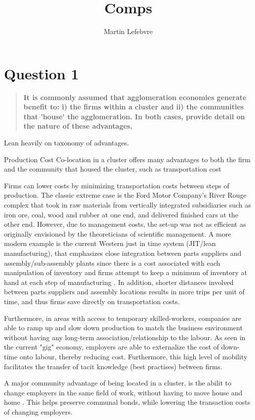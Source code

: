 \documentclass[12pt,letterpaper,notitlepage,onecolumn,final,openbib]{article}
\author{Martin Lefebvre}
\title{Comps}
\begin{document}
	
\section{Question 1}
\begin{quotation}
\textbf{It is commonly assumed that agglomeration economies generate benefit to: i) the firms within a cluster and ii) the communities that 'house' the agglomeration. In both cases, provide detail on the nature of these advantages.}

\end{quotation}


Lean heavily on  taxonomy of advantages.   

Production Cost
Co-location in a cluster offers many advantages to both the firm and the community that housed the cluster, such as transportation cost 

Firms can lower costs by minimizing transportation costs between steps of production.  The classic extreme case is the Ford Motor Company's River Rouge complex that took in raw materials from vertically integrated subsidiaries such as iron ore, coal, wood and rubber at one end, and delivered finished cars at the other end.  However, due to management costs, the set-up was not as efficient as originally envisioned by the theoreticians of scientific management. A more modern example is the current Western just in time system (JIT/lean manufacturing), that emphasizes close integration between parts suppliers and assembly/sub-assembly plants since there is a cost associated with each manipulation of inventory and firms attempt to keep a minimum of inventory at hand at each step of manufacturing \cite{Hallihan_JIT_1997}.  In addition, shorter distances involved between parts suppliers and assembly locations results in more trips per unit of time, and thus firms save directly on transportation costs. \cite{HeuvelLangenDonselaarEtAl2014}   


Furthermore, in areas with access to temporary skilled-workers, companies are able to ramp up and slow down production to match the business environment without having any long-term association/relationship to the labour. As seen in the current "gig" economy, employers are able to externalize the cost of down-time onto labour, thereby reducing cost.  Furthermore, this high level of mobility facilitates the transfer of tacit knowledge (best practises) between firms.    


     

A major community advantage of being located in a cluster, is the abilit to change employers in the same field of work, without having to move house and home \cite{HicklingArthursLow2009}.  This helps preserve communal bonds, while lowering the transaction costs of changing employers.   
\end{document}

